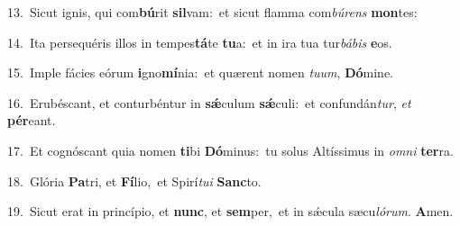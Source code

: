 {\numbfont\textcolor{\numbcolor}{13.}}~Sicut ignis, qui com\-\textbf{bú}\-rit \textbf{sil}\-vam:~\star et sicut flamma com\-\textit{bú}\-\textit{rens} \textbf{mon}\-tes:\par
{\numbfont\textcolor{\numbcolor}{14.}}~Ita persequéris illos in tempes\-\textbf{tá}\-te \textbf{tu}\-a:~\star et in ira tua tur\-\textit{bá}\-\textit{bis} \textbf{e}\-os.\par
{\numbfont\textcolor{\numbcolor}{15.}}~Imple fácies eórum \textbf{i}\-gno\-\textbf{mí}\-nia:~\star et quærent nomen \textit{tu}\-\textit{um}, \textbf{Dó}\-mine.\par
{\numbfont\textcolor{\numbcolor}{16.}}~Erubéscant, et conturbéntur in \textbf{sǽ}\-culum \textbf{sǽ}\-culi:~\star et confundán\-\textit{tur}\-, \textit{et} \textbf{pér}\-eant.\par
{\numbfont\textcolor{\numbcolor}{17.}}~Et cognóscant quia nomen \textbf{ti}\-bi \textbf{Dó}\-minus:~\star tu solus Altíssimus in \textit{om}\-\textit{ni} \textbf{ter}\-ra.\par
{\numbfont\textcolor{\numbcolor}{18.}}~Glória \textbf{Pa}\-tri, et \textbf{Fí}\-lio,~\star et Spirí\-\textit{tu}\-\textit{i} \textbf{Sanc}\-to.\par
{\numbfont\textcolor{\numbcolor}{19.}}~Sicut erat in princípio, et \textbf{nunc}\-, et \textbf{sem}\-per,~\star et in sǽcula sæcu\-\textit{ló}\-\textit{rum}. \textbf{A}\-men.\par
